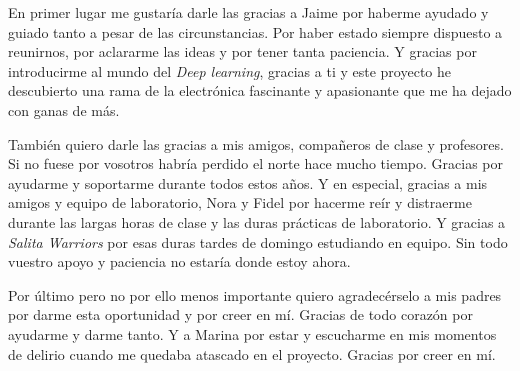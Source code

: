 En primer lugar me gustaría darle las gracias a Jaime por haberme ayudado y guiado tanto a pesar de las circunstancias. Por haber estado siempre dispuesto a reunirnos, por aclararme las ideas y por tener tanta paciencia. Y gracias por introducirme al mundo del \textit{Deep learning}, gracias a ti y este proyecto he descubierto una rama de la electrónica fascinante y apasionante que me ha dejado con ganas de más.

También quiero darle las gracias a mis amigos, compañeros de clase y profesores. Si no fuese por vosotros habría perdido el norte hace mucho tiempo. Gracias por ayudarme y soportarme durante todos estos años. Y en especial, gracias a mis amigos y equipo de laboratorio, Nora y Fidel por hacerme reír y distraerme durante las largas horas de clase y las duras prácticas de laboratorio. Y gracias a \textit{Salita Warriors} por esas duras tardes de domingo estudiando en equipo. Sin todo vuestro apoyo y paciencia no estaría donde estoy ahora.

Por último pero no por ello menos importante quiero agradecérselo a mis padres por darme esta oportunidad y por creer en mí. Gracias de todo corazón por ayudarme y darme tanto. Y a Marina por estar y escucharme en mis momentos de delirio cuando me quedaba atascado en el proyecto. Gracias por creer en mí.